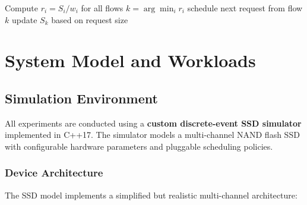 \documentclass[11pt]{article}
\begin{document}
\begin{algorithm}[h]
\caption{Min--Max Fairness Scheduler}
\begin{algorithmic}[1]
\State Compute $r_i = S_i / w_i$ for all flows
\State $k = \arg\min_i r_i$
\State schedule next request from flow $k$
\State update $S_k$ based on request size
\end{algorithmic}
\end{algorithm}

\section{System Model and Workloads}

\subsection{Simulation Environment}

All experiments are conducted using a \textbf{custom discrete-event SSD simulator} implemented in C++17. The simulator models a multi-channel NAND flash SSD with configurable hardware parameters and pluggable scheduling policies.

\subsubsection{Device Architecture}

The SSD model implements a simplified but realistic multi-channel architecture:
\end{document}
